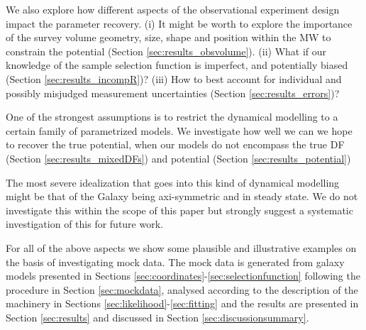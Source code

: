 We also explore how different aspects of the observational experiment design impact the parameter recovery. (i) It might be worth to explore the importance of the survey volume geometry, size, shape and position within the MW to constrain the potential (Section \ref{sec:results_obsvolume}). (ii) What if our knowledge of the sample selection function is imperfect, and potentially biased (Section \ref{sec:results_incompR})? (iii) How to best account for individual and possibly misjudged measurement uncertainties (Section \ref{sec:results_errors})?

One of the strongest assumptions is to restrict the dynamical modelling to a certain family of parametrized models. We investigate how well we can we hope to recover the true potential, when our models do not encompass the true DF (Section \ref{sec:results_mixedDFs}) and potential (Section \ref{sec:results_potential})

The most severe idealization that goes into this kind of dynamical modelling might be that of the Galaxy being axi-symmetric and in steady state. We do not investigate this within the scope of this paper but strongly suggest a systematic investigation of this for future work.

For all of the above aspects we show some plausible and illustrative examples on the basis of investigating mock data. The mock data is generated from galaxy models presented in Sections \ref{sec:coordinates}-\ref{sec:selectionfunction} following the procedure in Section \ref{sec:mockdata}, analysed according to the description of the \RM{} machinery in Sections \ref{sec:likelihood}-\ref{sec:fitting} and the results are presented in Section \ref{sec:results} and discussed in Section \ref{sec:discussionsummary}.
